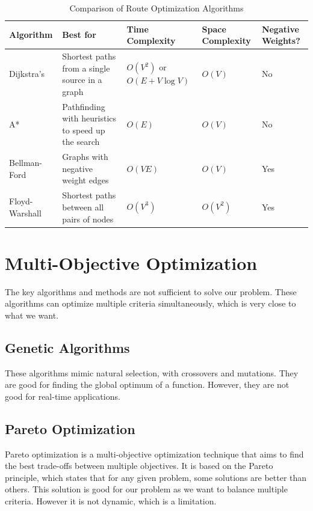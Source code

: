 \documentclass[10pt]{article}
\begin{document}
    \begin{table}[h]
        \centering
        \begin{tabularx}{\textwidth}{|X|X|X|X|X|}
            \hline
            \textbf{Algorithm} & \textbf{Best for}                                  & \textbf{Time Complexity}          & \textbf{Space Complexity} & \textbf{Negative Weights?} \\ \hline
            Dijkstra’s         & Shortest paths from a single source in a graph     & \(O(V^2)\) or \(O(E + V \log V)\) & \(O(V)\)                  & No                         \\ \hline
            A*                 & Pathfinding with heuristics to speed up the search & \(O(E)\)                          & \(O(V)\)                  & No                         \\ \hline
            Bellman-Ford       & Graphs with negative weight edges                  & \(O(VE)\)                         & \(O(V)\)                  & Yes                        \\ \hline
            Floyd-Warshall     & Shortest paths between all pairs of nodes          & \(O(V^3)\)                        & \(O(V^2)\)                & Yes                        \\ \hline
        \end{tabularx}
        \caption{Comparison of Route Optimization Algorithms}
        \label{tab:route_optimization_algorithms}
    \end{table}


    \section{Multi-Objective Optimization}\label{subsec:multi-objective-optimization}
    The key algorithms and methods are not sufficient to solve our problem.
    These algorithms can optimize multiple criteria simultaneously, which is very close to what we want.

    \subsection{Genetic Algorithms}\label{subsec:genetic-algorithms}
    These algorithms mimic natural selection, with crossovers and mutations.
    They are good for finding the global optimum of a function.
    However, they are not good for real-time applications.

    \subsection{Pareto Optimization}\label{subsec:pareto-optimization}
    Pareto optimization is a multi-objective optimization technique that aims to find the best trade-offs between multiple objectives.
    It is based on the Pareto principle, which states that for any given problem, some solutions are better than others.
    This solution is good for our problem as we want to balance multiple criteria.
    However it is not dynamic, which is a limitation.
\end{document}
